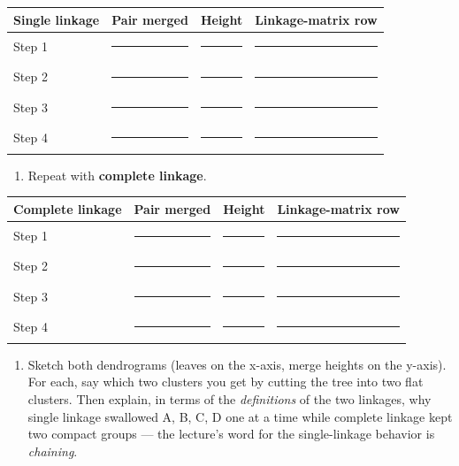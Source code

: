 \documentclass[
  11pt,
]{article}
\providecommand{\tightlist}{%
  \setlength{\itemsep}{0pt}\setlength{\parskip}{0pt}}
\newcommand{\answerspace}[1]{\par\vspace*{#1}}  %
\newcommand{\blank}[1][1.2in]{\rule{#1}{0.4pt}}
\begin{document}
\begin{longtable}[]{@{}llll@{}}
\toprule\noalign{}
Single linkage & Pair merged & Height & Linkage-matrix row \\
\midrule\noalign{}
\endhead
\bottomrule\noalign{}
\endlastfoot
Step 1 & \blank[1.2in] & \blank[0.7in] & \blank[2in] \\
Step 2 & \blank[1.2in] & \blank[0.7in] & \blank[2in] \\
Step 3 & \blank[1.2in] & \blank[0.7in] & \blank[2in] \\
Step 4 & \blank[1.2in] & \blank[0.7in] & \blank[2in] \\
\end{longtable}

\answerspace{4in}

\begin{enumerate}
\def\labelenumi{(\alph{enumi})}
\setcounter{enumi}{1}
\tightlist
\item
  Repeat with \textbf{complete linkage}.
\end{enumerate}

\begin{longtable}[]{@{}llll@{}}
\toprule\noalign{}
Complete linkage & Pair merged & Height & Linkage-matrix row \\
\midrule\noalign{}
\endhead
\bottomrule\noalign{}
\endlastfoot
Step 1 & \blank[1.2in] & \blank[0.7in] & \blank[2in] \\
Step 2 & \blank[1.2in] & \blank[0.7in] & \blank[2in] \\
Step 3 & \blank[1.2in] & \blank[0.7in] & \blank[2in] \\
Step 4 & \blank[1.2in] & \blank[0.7in] & \blank[2in] \\
\end{longtable}

\answerspace{3.2in}

\begin{enumerate}
\def\labelenumi{(\alph{enumi})}
\setcounter{enumi}{2}
\tightlist
\item
  Sketch both dendrograms (leaves on the x-axis, merge heights on the
  y-axis). For each, say which two clusters you get by cutting the tree
  into two flat clusters. Then explain, in terms of the
  \emph{definitions} of the two linkages, why single linkage swallowed
  A, B, C, D one at a time while complete linkage kept two compact
  groups --- the lecture's word for the single-linkage behavior is
  \emph{chaining}.
\end{enumerate}

\answerspace{3.4in}
\end{document}
